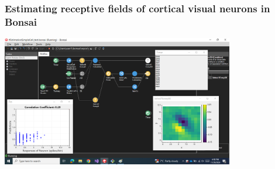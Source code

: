 \begin{frame}
    \frametitle{Estimating receptive fields of cortical visual neurons in Bonsai}

    \begin{center}
        \href{https://github.com/joacorapela/bonsai-oblr-corticalSimpleCellEx}{\includegraphics[width=4.0in]{figures/workflowOBLRsimpleCell.png}}
    \end{center}

\end{frame}

